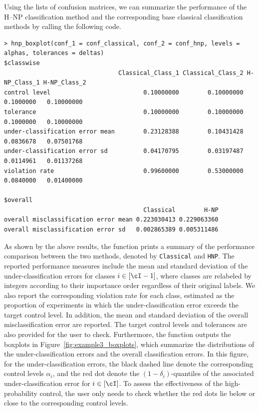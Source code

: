 Using the lists of confusion matrices, we can summarize the performance of the H--NP classification method and the corresponding base classical classification methods by calling the following code.
\begin{verbatim}
> hnp_boxplot(conf_1 = conf_classical, conf_2 = conf_hnp, levels = alphas, tolerances = deltas)
$classwise
                                Classical_Class_1 Classical_Class_2 H-NP_Class_1 H-NP_Class_2 
control level                          0.10000000        0.10000000    0.1000000   0.10000000
tolerance                              0.10000000        0.10000000    0.1000000   0.10000000
under-classification error mean        0.23128388        0.10431428    0.0836678   0.07501768
under-classification error sd          0.04170795        0.03197487    0.0114961   0.01137268
violation rate                         0.99600000        0.53000000    0.0840000   0.01400000

$overall
                                       Classical        H-NP
overall misclassification error mean 0.223030413 0.229063360
overall misclassification error sd   0.002865389 0.005311486
\end{verbatim}
As shown by the above results, the function prints a summary of the performance comparison between the two methods, denoted by \texttt{Classical} and \texttt{HNP}. The reported performance measures include the mean and standard deviation of the under-classification errors for classes \(i \in  [\cI - 1]\), where classes are relabeled by integers according to their importance order regardless of their original labels. We also report the corresponding violation rate for each class, estimated as the proportion of experiments in which the under-classification error exceeds the target control level. In addition, the mean and standard deviation of the overall misclassification error are reported. The target control levels and tolerances are also provided for the user to check. Furthermore, the function outputs the boxplots in Figure~\ref{fig:example3_boxplots}, which summarize the distributions of the under-classification errors and the overall classification errors. In this figure, for the under-classification errors, the black dashed line denote the corresponding control levels \(\alpha_i\), and the red dot denote the \((1-\delta_i)\)-quantiles of the associated under-classification error for \(i \in [\cI]\). To assess the effectiveness of the high-probability control, the user only needs to check whether the red dots lie  below or close to the corresponding control levels. 

